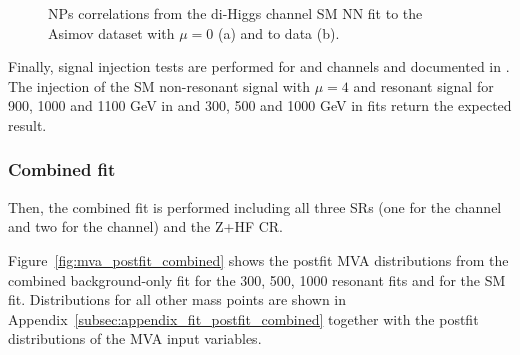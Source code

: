 \begin{figure}
\centering
{}\quad
{} \quad
\caption{NPs correlations from the di-Higgs \lephad channel SM NN fit to the Asimov dataset with $\mu=0$ (a) and to data (b).}
\label{fig:LepHadNPCorrelationsSM}
\end{figure}

Finally, signal injection tests are performed for \lephad and \hadhad channels and documented in . The injection of the SM non-resonant signal with 
$\mu=4$ and resonant signal for 900, 1000 and 1100 GeV in \hadhad and 300, 500 and 1000 GeV in \lephad fits return the expected result.

\subsubsection{Combined fit}


Then, the combined fit is performed including all three SRs (one for the \hadhad channel and two for the \lephad channel) and the Z+HF CR.

Figure~\ref{fig:mva_postfit_combined} shows the postfit MVA distributions from the combined background-only fit for the 300, 500, 1000 resonant fits and for the SM fit.  Distributions for all other mass points are shown in Appendix~\ref{subsec:appendix_fit_postfit_combined} together with the postfit distributions of the MVA input variables.

